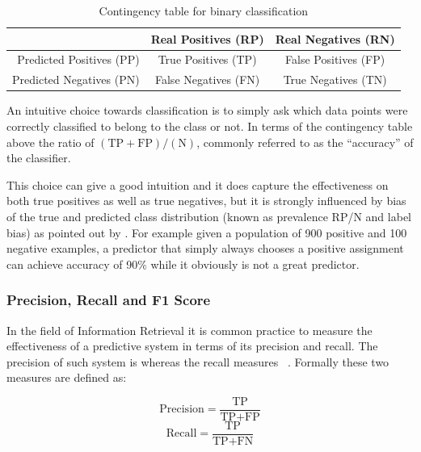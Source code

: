 \begin{table}[h]
  \begin{center}
    \begin{tabular}{r | c c }
      & Real Positives (RP) & Real Negatives (RN) \\
      \hline
      Predicted Positives (PP) & True Positives (TP) & False Positives (FP) \\
      Predicted Negatives (PN) & False Negatives (FN) & True Negatives (TN) \\
    \end{tabular}
  \caption{Contingency table for binary classification}
  \label{table:contingency-table-2}
  \end{center}
\end{table}

An intuitive choice towards classification is to simply ask which data points were correctly classified to belong to the class or not. In terms of the contingency table above the ratio of $(\text{TP} + \text{FP}) / (\text{N})$, commonly referred to as the ``accuracy'' of the classifier.

This choice can give a good intuition and it does capture the effectiveness on both true positives as well as true negatives, but it is strongly influenced by bias of the true and predicted class distribution (known as prevalence RP/N and label bias) as pointed out by \cite{Powers:2011aa}. For example given a population of 900 positive and 100 negative examples, a predictor that simply always chooses a positive assignment can achieve accuracy of 90\% while it obviously is not a great predictor.

\subsubsection{Precision, Recall and F1 Score}
\label{subs:precision-recall-f1score}

In the field of Information Retrieval it is common practice to measure the effectiveness of a predictive system in terms of its precision and recall.
The precision of such system is  whereas the recall measures ~\cite{Rijsbergen:1979aa}. Formally these two measures are defined as:

\begin{equation}
    \text{Precision} = \frac{\text{TP}}{\text{TP} + \text{FP}}
\end{equation}
\begin{equation}
    \text{Recall} = \frac{\text{TP}}{\text{TP} + \text{FN}}
\end{equation}

